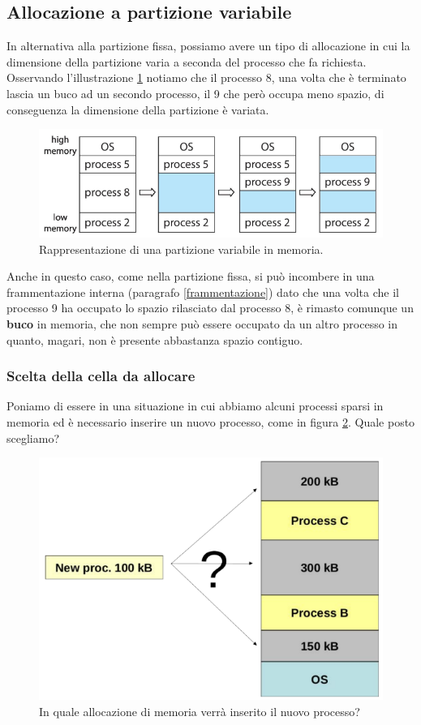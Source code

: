 % 
\subsection{Allocazione a partizione variabile}\label{partizione_variaibile}
In alternativa alla partizione fissa, possiamo avere un tipo di allocazione in cui la dimensione della partizione varia a seconda del processo che fa richiesta. Osservando l'illustrazione \ref{fig:variable_partition} notiamo che il processo 8, una volta che è terminato lascia un buco ad un secondo processo, il 9 che però occupa meno spazio, di conseguenza la dimensione della partizione è variata.
\begin{figure}[h]
    \centering
    \includegraphics[width = .55\textwidth]{../res/imgs/main memory/variable_partition.png}
    \caption{Rappresentazione di una partizione variabile in memoria.}
    \label{fig:variable_partition}
\end{figure}
Anche in questo caso, come nella partizione fissa, si può incombere in una frammentazione interna (paragrafo \ref{frammentazione}) dato che una volta che il processo 9 ha occupato lo spazio rilasciato dal processo 8, è rimasto comunque un \textbf{buco} in memoria, che non sempre può essere occupato da un altro processo in quanto, magari, non è presente abbastanza spazio contiguo.

% 
\subsubsection*{Scelta della cella da allocare}
Poniamo di essere in una situazione in cui abbiamo alcuni processi sparsi in memoria ed è necessario inserire un nuovo processo, come in figura \ref{fig:allocation_choice}. Quale posto scegliamo?
\begin{figure}[h]
    \centering
    \includegraphics[width = .4\textwidth]{../res/imgs/main memory/allocation_choice.png}
    \caption{In quale allocazione di memoria verrà inserito il nuovo processo?}
    \label{fig:allocation_choice}
\end{figure}

